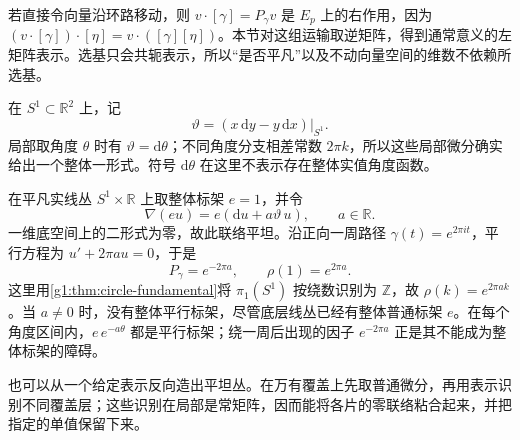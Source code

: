 若直接令向量沿环路移动，则 \(v\cdot[\gamma]=P_\gamma v\) 是 \(E_p\) 上的右作用，因为 \((v\cdot[\gamma])\cdot[\eta]=v\cdot([\gamma][\eta])\)。本节对这组运输取逆矩阵，得到通常意义的左矩阵表示。选基只会共轭表示，所以“是否平凡”以及不动向量空间的维数不依赖所选基。

\begin{example}
	\label{g1:exm:flat-circle-holonomy}
	在 \(S^1\subset\mathbb R^2\) 上，记
	\[
		\vartheta=(x\,\mathrm{d}y-y\,\mathrm{d}x)|_{S^1}.
	\]
	局部取角度 \(\theta\) 时有 \(\vartheta=\mathrm{d}\theta\)；不同角度分支相差常数 \(2\pi k\)，所以这些局部微分确实给出一个整体一形式。符号 \(\mathrm{d}\theta\) 在这里不表示存在整体实值角度函数。

	在平凡实线丛 \(S^1\times\mathbb R\) 上取整体标架 \(e=1\)，并令
	\[
		\nabla(eu)=e(\mathrm{d}u+a\vartheta\,u),\qquad a\in\mathbb R.
	\]
	一维底空间上的二形式为零，故此联络平坦。沿正向一周路径 \(\gamma(t)=e^{2\pi i t}\)，平行方程为 \(u'+2\pi a u=0\)，于是
	\[
		P_\gamma=e^{-2\pi a},\qquad
		\rho(1)=e^{2\pi a}.
	\]
	这里用\cref{g1:thm:circle-fundamental}将 \(\pi_1(S^1)\) 按绕数识别为 \(\mathbb Z\)，故 \(\rho(k)=e^{2\pi ak}\)。当 \(a\ne0\) 时，没有整体平行标架，尽管底层线丛已经有整体普通标架 \(e\)。在每个角度区间内，\(e\,e^{-a\theta}\) 都是平行标架；绕一周后出现的因子 \(e^{-2\pi a}\) 正是其不能成为整体标架的障碍。
\end{example}

也可以从一个给定表示反向造出平坦丛。在万有覆盖上先取普通微分，再用表示识别不同覆盖层；这些识别在局部是常矩阵，因而能将各片的零联络粘合起来，并把指定的单值保留下来。

